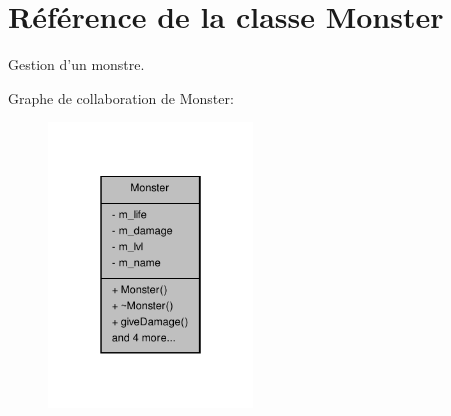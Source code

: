 \hypertarget{class_monster}{\section{Référence de la classe Monster}
\label{class_monster}
}


Gestion d'un monstre.  




Graphe de collaboration de Monster\-:
\nopagebreak
\begin{figure}[H]
\begin{center}
\leavevmode
\includegraphics[width=154pt]{class_monster__coll__graph}
\end{center}
\end{figure}
